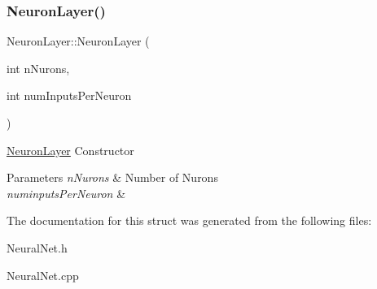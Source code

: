 \subsubsection{\texorpdfstring{Neuron\+Layer()}{NeuronLayer()}}
{\footnotesize\ttfamily Neuron\+Layer\+::\+Neuron\+Layer (\begin{DoxyParamCaption}\item[{int}]{n\+Nurons,  }\item[{int}]{num\+Inputs\+Per\+Neuron }\end{DoxyParamCaption})}

\hyperlink{struct_neuron_layer}{Neuron\+Layer} Constructor 
\begin{DoxyParams}{Parameters}
{\em n\+Nurons} & Number of Nurons \\
\hline
{\em numinputs\+Per\+Neuron} & \\
\hline
\end{DoxyParams}


The documentation for this struct was generated from the following files\+:\begin{DoxyCompactItemize}
\item 
Neural\+Net.\+h\item 
Neural\+Net.\+cpp\end{DoxyCompactItemize}
